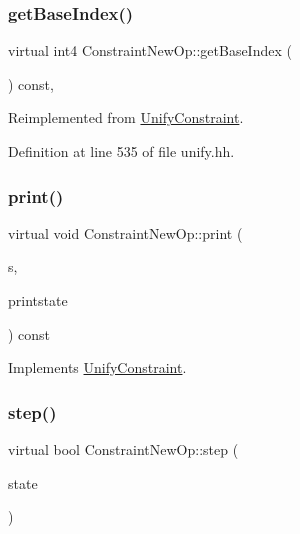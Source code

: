 \subsubsection{\texorpdfstring{getBaseIndex()}{getBaseIndex()}}
{\footnotesize\ttfamily virtual int4 Constraint\+New\+Op\+::get\+Base\+Index (\begin{DoxyParamCaption}\item[{void}]{ }\end{DoxyParamCaption}) const\hspace{0.3cm}{\ttfamily [inline]}, {\ttfamily [virtual]}}



Reimplemented from \mbox{\hyperlink{class_unify_constraint_a44f0164f38ac1fdc44fc73ebe7678de1}{Unify\+Constraint}}.



Definition at line 535 of file unify.\+hh.

\mbox{\label{class_constraint_new_op_ad247112189d345a7d7ddf7c785514d56}} 
\subsubsection{\texorpdfstring{print()}{print()}}
{\footnotesize\ttfamily virtual void Constraint\+New\+Op\+::print (\begin{DoxyParamCaption}\item[{ostream \&}]{s,  }\item[{\mbox{\hyperlink{class_unify_c_printer}{Unify\+C\+Printer}} \&}]{printstate }\end{DoxyParamCaption}) const\hspace{0.3cm}{\ttfamily [virtual]}}



Implements \mbox{\hyperlink{class_unify_constraint_a774f6a611a96384766cb8e8d8f5ff41f}{Unify\+Constraint}}.

\mbox{\label{class_constraint_new_op_a53678f806d79236bb280167323593063}} 
\subsubsection{\texorpdfstring{step()}{step()}}
{\footnotesize\ttfamily virtual bool Constraint\+New\+Op\+::step (\begin{DoxyParamCaption}\item[{\mbox{\hyperlink{class_unify_state}{Unify\+State}} \&}]{state }\end{DoxyParamCaption})\hspace{0.3cm}{\ttfamily [virtual]}}



